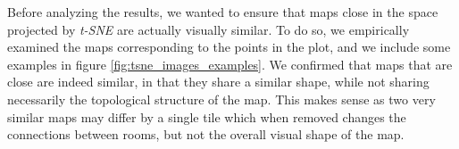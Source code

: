 Before analyzing the results, we wanted to ensure that maps close in the space projected by \textit{t-SNE} are actually visually similar. To do so, we empirically examined the maps corresponding to the points in the plot, and we include some examples in figure \cref{fig:tsne_images_examples}. We confirmed that maps that are close are indeed similar, in that they share a similar shape, while not sharing necessarily the topological structure of the map. This makes sense as two very similar maps may differ by a single tile which when removed changes the connections between rooms, but not the overall visual shape of the map.

\begin{figure}[hbt!]
    \centering
    \qquad
    \qquad
\end{figure}
